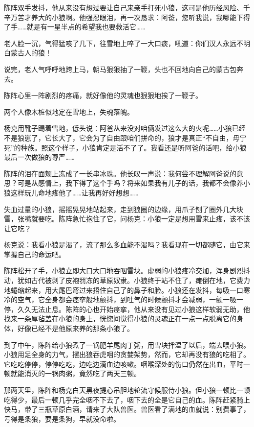 \par 陈阵双手发抖，他从来没有想过要让自己来亲手打死小狼，这可是他历经风险、千辛万苦才养大的小狼啊。他强忍眼泪，再一次恳求：阿爸，您听我说，我哪能下得了手……就是有一星半点的希望我也要救活它……
\par 老人脸一沉，气得猛咳了几下，往雪地上啐了一大口痰，吼道：你们汉人永远不明白蒙古人的狼！
\par 说完，老人气呼呼地跨上马，朝马狠狠抽了一鞭，头也不回地向自己的蒙古包奔去。
\par 陈阵心里一阵剧烈的疼痛，就好像他的灵魂也狠狠地挨了一鞭子。
\par 两个人像木桩似地定在雪地上，失魂落魄。
\par 杨克用靴子踢着雪地，低头说：阿爸从来没对咱俩发过这么大的火呢……小狼已经不是狼崽了，它长大了，它会为了自由跟咱们拼命的，狼才是真正“不自由，毋宁死”的种族。照这个样子，小狼肯定是活不了了。我看还是听阿爸的话吧，给小狼最后一次做狼的尊严……
\par 陈阵的泪在面颊上冻成了一长串冰珠。他长叹一声说：我何尝不理解阿爸说的意思？可是从感情上，我下得了这个手吗？将来如果我有儿子的话，我都不会像养小狼这样玩儿命地疼他了……让我再好好想想……
\par 失血过量的小狼，摇摇晃晃地站起来，走到狼圈的边缘，用爪子刨了圈外几大块雪，张嘴就要吃。陈阵急忙抱住了它，问杨克：小狼一定是想用雪来止疼，该不该让它吃？
\par 杨克说：我看小狼是渴了，流了那么多血能不渴吗？我看现在一切都随它，由它来掌握自己的命运吧。
\par 陈阵松开了手，小狼立即大口大口地吞咽雪块。虚弱的小狼疼冷交加，浑身剧烈抖动，犹如古代被剥了皮袍罚冻的草原奴隶。小狼终于站不住了，瘫倒在地，它费力地蜷缩起来，用大尾巴弯过来捂住自己了的鼻子和脸。小狼还在发抖，每吸一口寒冷的空气，它全身都会痉挛般地颤抖，到吐气的时候颤抖才会减弱，一颤一吸一停，久久无法止息。陈阵的心也开始痉挛，他从来没有见过小狼这样软弱无助，他找来一条厚毡盖在小狼的身上，恍惚间觉得小狼的灵魂正在一点一点脱离它的身体，好像已经不是他原来养的那条小狼了。
\par 到了中午，陈阵给小狼煮了一锅肥羊尾肉丁粥，用雪块拌温了以后，端去喂小狼。小狼用足全身的力气，摆出狼吞虎咽的贪婪架势，然而，它却再没有狼的吃相了。它吃吃停停，停停吃吃，边吃边滴血边咳嗽。咽喉深处的伤口仍然在出血，平时一顿就能消灭的一锅肉粥，竟然吃了两天三顿。
\par 那两天里，陈阵和杨克白天黑夜提心吊胆地轮流守候服侍小狼。但小狼一顿比一顿吃得少，最后一顿几乎完全咽不下去了，咽下去的全是它自己的血。陈阵赶紧骑上快马，带了三瓶草原白酒，请来了大队兽医。兽医看了满地的血就说：别费事了，亏得是条狼，要是条狗，早就没命啦。
